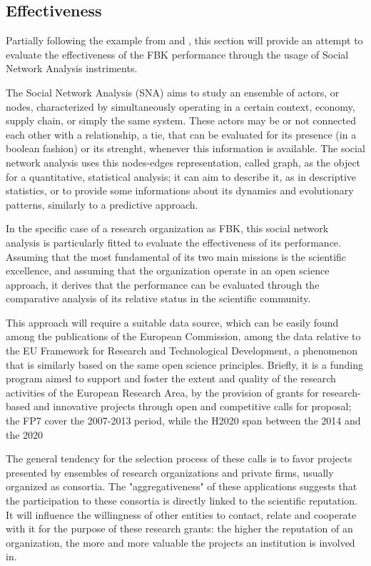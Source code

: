 \subsection{Effectiveness}

Partially following the example from \citet{Giuliani2005} and \citet{Cantner2006}, this section will provide an attempt to evaluate the effectiveness of the FBK performance through the usage of Social Network Analysis instriments. 

The Social Network Analysis (SNA) aims to study an ensemble of actors, or nodes, characterized by simultaneously operating in a certain context, economy, supply chain, or simply the same system. These actors may be or not connected each other with a relationship, a tie, that can be evaluated for its presence (in a boolean fashion) or its strenght, whenever this information is available. The social network analysis uses this nodes-edges representation, called graph, as the object for a quantitative, statistical analysis; it can aim to describe it, as in descriptive statistics, or to provide some informations about its dynamics and evolutionary patterns, similarly to a predictive approach.

In the specific case of a research organization as FBK, this social network analysis is particularly fitted to evaluate the effectiveness of its performance. Assuming that the most fundamental of its two main missions is the scientific excellence, and assuming that the organization operate in an open science approach, it derives that the performance can be evaluated through the comparative analysis of its relative status in the scientific community.

This approach will require a suitable data source, which can be easily found among the publications of the European Commission, among the data relative to the EU Framework for Research and Technological Development, a phenomenon that is similarly based on the same open science principles. Briefly, it is a funding program aimed to support and foster the extent and quality of the research activities of the European Research Area, by the provision of grants for research-based and innovative projects through open and competitive calls for proposal; the FP7 cover the 2007-2013 period, while the H2020 span between the 2014 and the 2020

The general tendency for the selection process of these calls is to favor projects presented by ensembles of research organizations and private firms, usually organized as consortia. The "aggregativeness" of these applications suggests that the participation to these consortia is directly linked to the scientific reputation. It will influence the willingness of other entities to contact, relate and cooperate with it for the purpose of these research grants: the higher the reputation of an organization, the more and more valuable the projects an institution is involved in.

